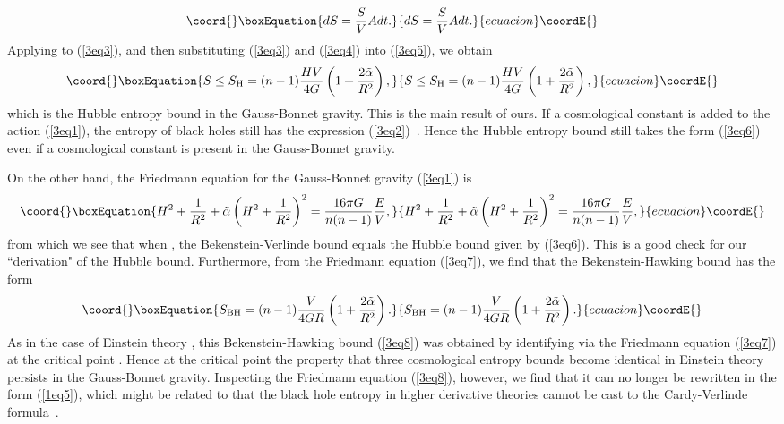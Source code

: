 \documentclass[a4paper,12pt]{article}
\begin{document}
\begin{equation}\coord{}\boxEquation{
\label{3eq5}
dS =\frac{S}{V} A dt.
}{
dS =\frac{S}{V} A dt.
}{ecuacion}\coordE{}\end{equation}
Applying \coordHE{} to (\ref{3eq3}), and then substituting (\ref{3eq3}) and
(\ref{3eq4}) into (\ref{3eq5}), we obtain
\begin{equation}\coord{}\boxEquation{
\label{3eq6}
S \le S_{\rm H} =(n-1) \frac{HV}{4G}\left (1+\frac{2\tilde \alpha}{R^2}\right),
}{
S \le S_{\rm H} =(n-1) \frac{HV}{4G}\left (1+\frac{2\tilde \alpha}{R^2}\right),
}{ecuacion}\coordE{}\end{equation}
which is the Hubble entropy bound in the Gauss-Bonnet gravity. This is the main result
of ours.  If a cosmological
constant is added to the action (\ref{3eq1}), the entropy of black holes still has
the expression (\ref{3eq2})~\cite{Cai}.
Hence the Hubble entropy bound still takes the form (\ref{3eq6}) even if
 a cosmological constant is present in the Gauss-Bonnet gravity.


On the other hand, the Friedmann equation for the Gauss-Bonnet
gravity (\ref{3eq1}) is
\begin{equation}\coord{}\boxEquation{
\label{3eq7}
 H^2 +\frac{1}{R^2} +\tilde \alpha \left (H^2 +\frac{1}{R^2}\right)^2
 = \frac{16\pi G}{n(n-1)}\frac{E}{V},
}{
H^2 +\frac{1}{R^2} +\tilde \alpha \left (H^2 +\frac{1}{R^2}\right)^2
 = \frac{16\pi G}{n(n-1)}\frac{E}{V},
}{ecuacion}\coordE{}\end{equation}
from which we see that when \coordHE{}, the Bekenstein-Verlinde bound \coordHE{} equals  the Hubble bound \coordHE{} given by (\ref{3eq6}).
This is a good check for our ``derivation" of the Hubble bound.
Furthermore, from the Friedmann equation (\ref{3eq7}), we find that the
Bekenstein-Hawking bound has the form
\begin{equation}\coord{}\boxEquation{
\label{3eq8}
S_{\rm BH} =(n-1)\frac{V}{4GR}\left( 1 +\frac{2\tilde \alpha}{R^2}\right).
}{
S_{\rm BH} =(n-1)\frac{V}{4GR}\left( 1 +\frac{2\tilde \alpha}{R^2}\right).
}{ecuacion}\coordE{}\end{equation}
As in the case of Einstein theory \cite{Verl}, this Bekenstein-Hawking bound
(\ref{3eq8}) was obtained by identifying \coordHE{} via the Friedmann
equation (\ref{3eq7}) at the critical point \coordHE{}.  Hence at the critical point
the property that three cosmological entropy bounds  become identical in Einstein theory
persists
in the Gauss-Bonnet gravity. Inspecting the Friedmann equation (\ref{3eq8}), however,
we find that it can no longer be rewritten in the form (\ref{1eq5}), which might be related
to that the black hole entropy in higher derivative theories cannot be cast to the
Cardy-Verlinde formula~\cite{Cai2}.
\end{document}
